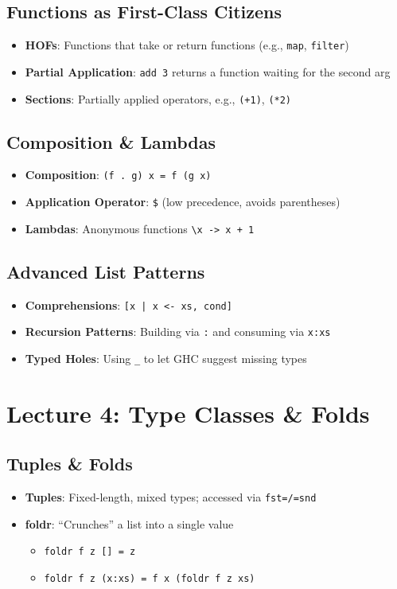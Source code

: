 \documentclass[11pt,twoside=off,openright,numbers=noenddot]{scrbook}
\begin{document}
\section{Functions as First-Class Citizens}
\label{sec:org732ac5d}
\begin{itemize}
\item \textbf{HOFs}: Functions that take or return functions (e.g., \texttt{map}, \texttt{filter})
\item \textbf{Partial Application}: \texttt{add 3} returns a function waiting for the second arg
\item \textbf{Sections}: Partially applied operators, e.g., \texttt{(+1)}, \texttt{(*2)}
\end{itemize}
\section{Composition \& Lambdas}
\label{sec:org4f0bbc5}
\begin{itemize}
\item \textbf{Composition}: \texttt{(f . g) x = f (g x)}
\item \textbf{Application Operator}: \texttt{\$} (low precedence, avoids parentheses)
\item \textbf{Lambdas}: Anonymous functions \texttt{\textbackslash{}x -> x + 1}
\end{itemize}
\section{Advanced List Patterns}
\label{sec:orgbec4f4c}
\begin{itemize}
\item \textbf{Comprehensions}: \texttt{[x | x <- xs, cond]}
\item \textbf{Recursion Patterns}: Building via \texttt{:} and consuming via \texttt{x:xs}
\item \textbf{Typed Holes}: Using \texttt{\_} to let GHC suggest missing types
\end{itemize}
\chapter{Lecture 4: Type Classes \& Folds}
\label{sec:org14190aa}
\section{Tuples \& Folds}
\label{sec:org496ed99}
\begin{itemize}
\item \textbf{Tuples}: Fixed-length, mixed types; accessed via \texttt{fst=/=snd}
\item \textbf{foldr}: ``Crunches'' a list into a single value
\begin{itemize}
\item \texttt{foldr f z [] = z}
\item \texttt{foldr f z (x:xs) = f x (foldr f z xs)}
\end{itemize}
\end{itemize}
\end{document}
